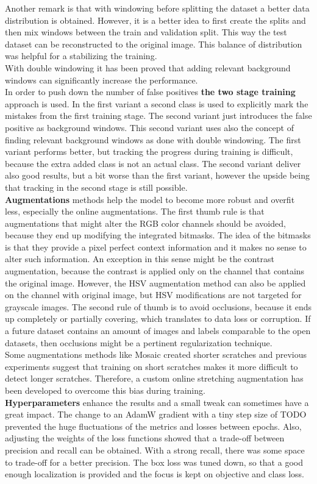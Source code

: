 Another remark is that with windowing before splitting the dataset a better data distribution is obtained. However, it is a better idea to first create the splits and then mix windows between the train and validation split. This way the test dataset can be reconstructed to the original image. This balance of distribution was helpful for a stabilizing the training. \\
With double windowing it has been proved that adding relevant background windows can significantly increase the performance.\\
In order to push down the number of false positives \textbf{the two stage training} approach is used. In the first variant a second class is used to explicitly mark the mistakes from the first training stage. The second variant just introduces the false positive as background windows. This second variant uses also the concept of finding relevant background windows as done with double windowing. The first variant performs better, but tracking the progress during training is difficult, because the extra added class is not an actual class. The second variant deliver also good results, but a bit worse than the first variant, however the upside being that tracking in the second stage is still possible. \\
\textbf{Augmentations} methods help the model to become more robust and overfit less, especially the online augmentations. The first thumb rule is that augmentations that might alter the RGB color channels should be avoided, because they end up modifying the integrated bitmasks. The idea of the bitmasks is that they provide a pixel perfect context information and it makes no sense to alter such information. An exception in this sense might be the contrast augmentation, because the contrast is applied only on the channel that contains the original image. However, the HSV augmentation method can also be applied on the channel with original image, but HSV modifications are not targeted for grayscale images. The second rule of thumb is to avoid occlusions, because it ends up completely or partially covering, which translates to data loss or corruption. If a future dataset contains an amount of images and labels comparable to the open datasets, then occlusions might be a pertinent regularization technique. \\
Some augmentations methods like Mosaic created shorter scratches and previous experiments suggest that training on short scratches makes it more difficult to detect longer scratches. Therefore, a custom online stretching augmentation has been developed to overcome this bias during training. \\
\textbf{Hyperparameters} enhance the results and a small tweak can sometimes have a great impact. The change to an AdamW gradient with a tiny step size of TODO prevented the huge fluctuations of the metrics and losses between epochs. Also, adjusting the weights of the loss functions showed that a trade-off between precision and recall can be obtained. With a strong recall, there was some space to trade-off for a better precision. The box loss was tuned down, so that a good enough localization is provided and the focus is kept on objective and class loss.

